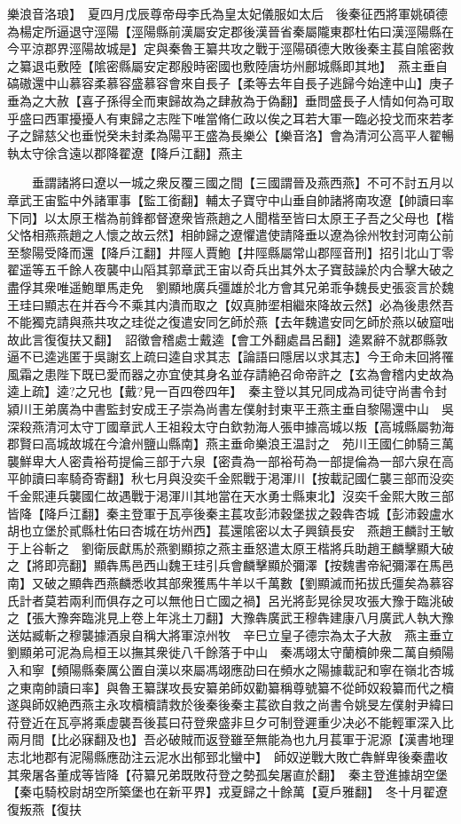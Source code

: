 樂浪音洛琅】　夏四月戊辰尊帝母李氏為皇太妃儀服如太后　後秦征西將軍姚碩德為楊定所逼退守涇陽【涇陽縣前漢屬安定郡後漢晉省秦屬隴東郡杜佑曰漢涇陽縣在今平涼郡界涇陽故城是】定與秦魯王纂共攻之戰于涇陽碩德大敗後秦主萇自隂密救之纂退屯敷陸【隂密縣屬安定郡殷時密國也敷陸唐坊州鄜城縣即其地】　燕主垂自碻磝還中山慕容柔慕容盛慕容會來自長子【柔等去年自長子逃歸今始達中山】庚子垂為之大赦【喜子孫得全而東歸故為之肆赦為于偽翻】垂問盛長子人情如何為可取乎盛曰西軍擾擾人有東歸之志陛下唯當脩仁政以俟之耳若大軍一臨必投戈而來若孝子之歸慈父也垂悦癸未封柔為陽平王盛為長樂公【樂音洛】會為清河公高平人翟暢執太守徐含遠以郡降翟遼【降戶江翻】燕主

　　垂謂諸將曰遼以一城之衆反覆三國之間【三國謂晉及燕西燕】不可不討五月以章武王宙監中外諸軍事【監工銜翻】輔太子寶守中山垂自帥諸將南攻遼【帥讀曰率下同】以太原王楷為前鋒都督遼衆皆燕趙之人聞楷至皆曰太原王子吾之父母也【楷父恪相燕燕趙之人懷之故云然】相帥歸之遼懼遣使請降垂以遼為徐州牧封河南公前至黎陽受降而還【降戶江翻】井陘人賈鮑【井陘縣屬常山郡陘音刑】招引北山丁零翟遥等五千餘人夜襲中山䧟其郭章武王宙以奇兵出其外太子寶鼓譟於内合擊大破之盡俘其衆唯遥鮑單馬走免　劉顯地廣兵彊雄於北方會其兄弟乖争魏長史張衮言於魏王珪曰顯志在并吞今不乘其内潰而取之【奴真肺埿相繼來降故云然】必為後患然吾不能獨克請與燕共攻之珪從之復遣安同乞師於燕【去年魏遣安同乞師於燕以破窟咄故此言復復扶又翻】　詔徵會稽處士戴逵【會工外翻處昌呂翻】逵累辭不就郡縣敦逼不已逵逃匿于吳謝玄上疏曰逵自求其志【論語曰隱居以求其志】今王命未回將罹風霜之患陛下既已愛而器之亦宜使其身名並存請絶召命帝許之【玄為會稽内史故為逵上疏】逵?之兄也【戴?見一百四卷四年】　秦主登以其兄同成為司徒守尚書令封潁川王弟廣為中書監封安成王子崇為尚書左僕射封東平王燕主垂自黎陽還中山　吳深殺燕清河太守丁國章武人王祖殺太守白欽勃海人張申據高城以叛【高城縣屬勃海郡賢曰高城故城在今滄州鹽山縣南】燕主垂命樂浪王温討之　苑川王國仁帥騎三萬襲鮮卑大人密貴裕苟提倫三部于六泉【密貴為一部裕苟為一部提倫為一部六泉在高平帥讀曰率騎奇寄翻】秋七月與没奕千金熙戰于渇渾川【按載記國仁襲三部而没奕千金熙連兵襲國仁故遇戰于渇渾川其地當在天水勇士縣東北】沒奕千金熙大敗三部皆降【降戶江翻】秦主登軍于瓦亭後秦主萇攻彭沛穀堡拔之穀犇杏城【彭沛穀盧水胡也立堡於貳縣杜佑曰杏城在坊州西】萇還隂密以太子興鎮長安　燕趙王麟討王敏于上谷斬之　劉衛辰獻馬於燕劉顯掠之燕主垂怒遣太原王楷將兵助趙王麟擊顯大破之【將即亮翻】顯犇馬邑西山魏王珪引兵會麟擊顯於彌澤【按魏書帝紀彌澤在馬邑南】又破之顯犇西燕麟悉收其部衆獲馬牛羊以千萬數【劉顯滅而拓拔氏彊矣為慕容氏計者莫若兩利而俱存之可以無他日亡國之禍】呂光將彭晃徐炅攻張大豫于臨洮破之【張大豫奔臨洮見上卷上年洮土刀翻】大豫犇廣武王穆犇建康八月廣武人執大豫送姑臧斬之穆襲據酒泉自稱大將軍涼州牧　辛巳立皇子德宗為太子大赦　燕主垂立劉顯弟可泥為烏桓王以撫其衆徙八千餘落于中山　秦馮翊太守蘭櫝帥衆二萬自頻陽入和寧【頻陽縣秦厲公置自漢以來屬馮翊應劭曰在頻水之陽據載記和寧在嶺北杏城之東南帥讀曰率】與魯王纂謀攻長安纂弟師奴勸纂稱尊號纂不從師奴殺纂而代之櫝遂與師奴絶西燕主永攻櫝櫝請救於後秦後秦主萇欲自救之尚書令姚旻左僕射尹緯曰苻登近在瓦亭將乘虚襲吾後萇曰苻登衆盛非旦夕可制登遲重少决必不能輕軍深入比兩月間【比必寐翻及也】吾必破賊而返登雖至無能為也九月萇軍于泥源【漢書地理志北地郡有泥陽縣應劭注云泥水出郁郅北蠻中】　師奴逆戰大敗亡犇鮮卑後秦盡收其衆屠各董成等皆降【苻纂兄弟既敗苻登之勢孤矣屠直於翻】　秦主登進據胡空堡【秦屯騎校尉胡空所築堡也在新平界】戎夏歸之十餘萬【夏戶雅翻】　冬十月翟遼復叛燕【復扶